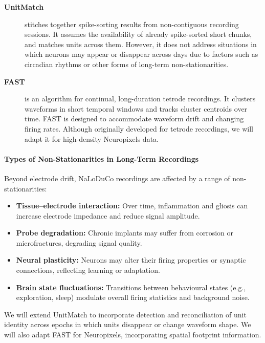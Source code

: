 \begin{description}
    \item[\textbf{UnitMatch}] \citep{vanBeestEtAl24} stitches together spike-sorting results from non-contiguous recording sessions. It assumes the availability of already spike-sorted short chunks, and matches units across them. However, it does not address situations in which neurons may appear or disappear across days due to factors such as circadian rhythms or other forms of long-term non-stationarities.
    
    \item[\textbf{FAST}] \citep{dhawaleEtAl17} is an algorithm for continual, long-duration tetrode recordings. It clusters waveforms in short temporal windows and tracks cluster centroids over time. FAST is designed to accommodate waveform drift and changing firing rates. Although originally developed for tetrode recordings, we will adapt it for high-density Neuropixels data.
\end{description}

\paragraph{Types of Non-Stationarities in Long-Term Recordings}
Beyond electrode drift, NaLoDuCo recordings are affected by a range of non-stationarities:

\begin{itemize}
    \item \textbf{Tissue–electrode interaction:} Over time, inflammation and gliosis can increase electrode impedance and reduce signal amplitude.
    \item \textbf{Probe degradation:} Chronic implants may suffer from corrosion or microfractures, degrading signal quality.
    \item \textbf{Neural plasticity:} Neurons may alter their firing properties or synaptic connections, reflecting learning or adaptation.
    \item \textbf{Brain state fluctuations:} Transitions between behavioural states (e.g., exploration, sleep) modulate overall firing statistics and background noise.
\end{itemize}

We will extend UnitMatch to incorporate detection and reconciliation of unit identity across epochs in which units disappear or change waveform shape. We will also adapt FAST for Neuropixels, incorporating spatial footprint information.

